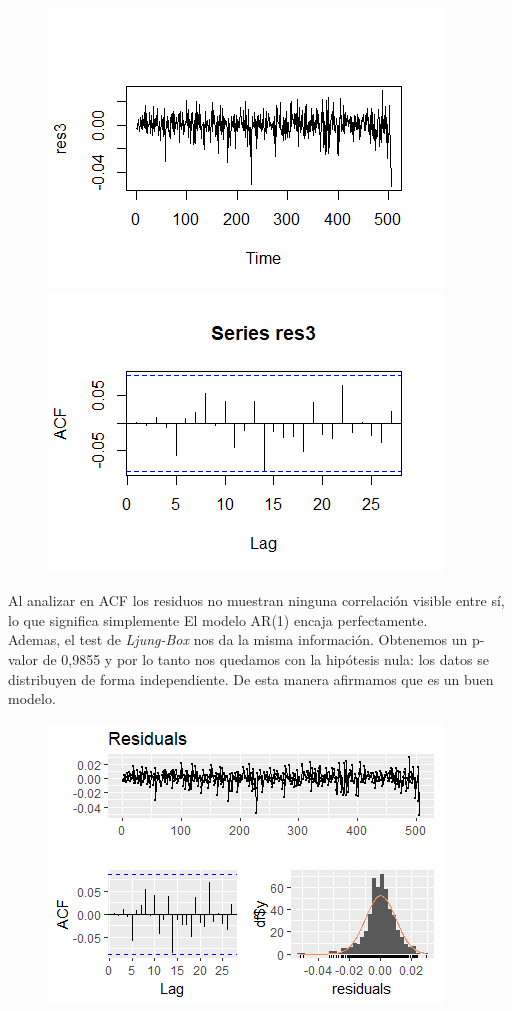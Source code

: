 \documentclass[a4paper,]{article}
\begin{document}
\begin{figure}[H]
    \centering \includegraphics[width=0.4\linewidth]{Rplot08.png}
    \includegraphics[width=0.4\linewidth]{Rplot09.png}
\end{figure}

Al analizar en ACF los residuos no muestran ninguna correlación visible entre sí, lo que significa simplemente
El modelo AR(1) encaja perfectamente.\\

Ademas, el test de \textit{Ljung-Box} nos da la misma información.
Obtenemos un p-valor de 0,9855 y por lo tanto nos quedamos con la hipótesis nula: los datos se distribuyen de forma independiente. De esta manera afirmamos que es un buen modelo.

\begin{figure}[H]
    \centering \includegraphics[width=0.5\linewidth]{Rplot10.png}
\end{figure}
\end{document}
